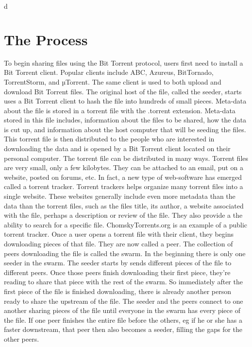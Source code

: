 d\documentclass[a4paper,12pt]{report}
\begin{document}
\section{The Process}
To begin sharing files using the Bit Torrent protocol, users first need to install a Bit Torrent client. 
Popular clients include ABC, Azureus, BitTornado, TorrentStorm, and µTorrent. The same client is used to both upload and download Bit Torrent files.
The original host of the file, called the seeder, starts uses a Bit Torrent client to hash the file into hundreds of small pieces. 
Meta-data about the file is stored in a torrent file with the .torrent extension. 
Meta-data stored in this file includes, information about the files to be shared, how the data is cut up, and information about the host computer that will be seeding the files. 
This torrent file is then distributed to the people who are interested in downloading the data and is opened by a Bit Torrent client located on their personal computer. 
The torrent file can be distributed in many ways. 
Torrent files are very small, only a few kilobytes. They can be attached to an email, put on a website, posted on forums, etc. 
In fact, a new type of web-software has emerged called a torrent tracker.
Torrent trackers helps organize many torrent files into a single website. These websites generally include even more metadata than the data than the torrent files, such as the files title, its author, a website associated with the file, perhaps a description or review of the file. 
They also provide a the ability to search for a specific file. ChomskyTorrents.org is an example of a public torrent tracker.
Once a user opens a torrent file with their client, they begins downloading pieces of that file. 
They are now called a peer. 
The collection of peers downloading the file is called the swarm. 
In the beginning there is only one seeder in the swarm. 
The seeder starts by sends different pieces of the file to different peers. Once those peers finish downloading their first piece, they’re reading to share that piece with the rest of the swarm. 
So immediately after the first piece of the file is finished downloading, there is already another person ready to share the upstream of the file. 
The seeder and the peers connect to one another sharing pieces of the file until everyone in the swarm has every piece of the file. 
If one peer finishes the entire file before the others, eg if he or she has a faster downstream, that peer then also becomes a seeder, filling the gaps for the other peers.
\end{document}
